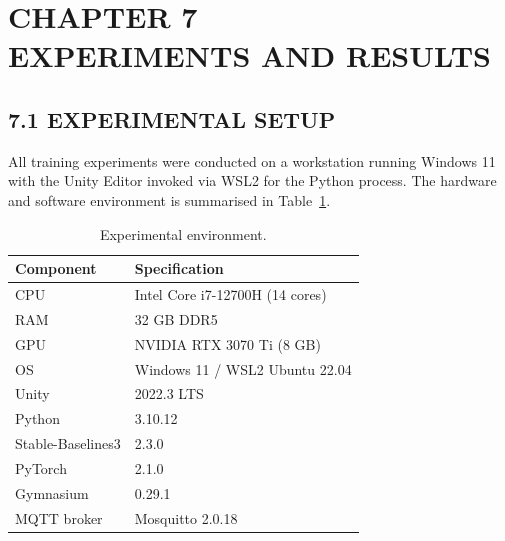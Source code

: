 \documentclass[12pt,a4paper]{article}
\begin{document}
\clearpage

\section*{\centering CHAPTER 7\\[0.3cm] EXPERIMENTS AND RESULTS}
\vspace{2\baselineskip}

\subsection*{7.1 \quad EXPERIMENTAL SETUP}

\indent All training experiments were conducted on a workstation running
Windows 11 with the Unity Editor invoked via WSL2 for the Python process.
The hardware and software environment is summarised in Table~\ref{tab:setup}.

\begin{table}[H]
  \centering
  \caption{Experimental environment.}
  \label{tab:setup}
  \vspace{0.5\baselineskip}
  \begin{tabular}{ll}
    \toprule
    \textbf{Component} & \textbf{Specification} \\
    \midrule
    CPU              & Intel Core i7-12700H (14 cores) \\
    RAM              & 32 GB DDR5 \\
    GPU              & NVIDIA RTX 3070 Ti (8 GB) \\
    OS               & Windows 11 / WSL2 Ubuntu 22.04 \\
    Unity            & 2022.3 LTS \\
    Python           & 3.10.12 \\
    Stable-Baselines3 & 2.3.0 \\
    PyTorch          & 2.1.0 \\
    Gymnasium        & 0.29.1 \\
    MQTT broker      & Mosquitto 2.0.18 \\
    \bottomrule
  \end{tabular}
\end{table}
\end{document}
